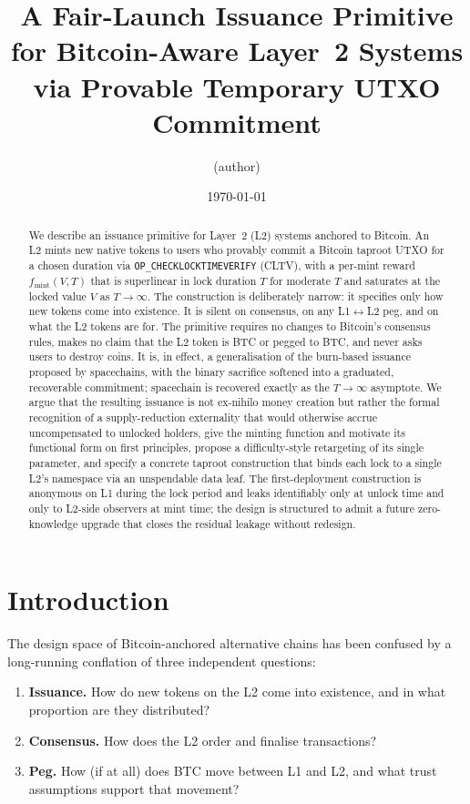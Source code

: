 \documentclass[11pt,a4paper]{article}
\title{\textbf{A Fair-Launch Issuance Primitive for Bitcoin-Aware Layer~2 Systems via Provable Temporary UTXO Commitment}}
\author{(author)}
\date{\today}
\newcommand{\fmint}{f_{\mathrm{mint}}}
\begin{document}
\maketitle

\begin{abstract}
\noindent We describe an issuance primitive for Layer~2 (L2) systems anchored to Bitcoin. An L2 mints new native tokens to users who provably commit a Bitcoin taproot UTXO for a chosen duration via \texttt{OP\_CHECKLOCKTIMEVERIFY} (CLTV), with a per-mint reward $\fmint(V, T)$ that is superlinear in lock duration $T$ for moderate $T$ and saturates at the locked value $V$ as $T \to \infty$. The construction is deliberately narrow: it specifies only how new tokens come into existence. It is silent on consensus, on any L1$\leftrightarrow$L2 peg, and on what the L2 tokens are for. The primitive requires no changes to Bitcoin's consensus rules, makes no claim that the L2 token is BTC or pegged to BTC, and never asks users to destroy coins. It is, in effect, a generalisation of the burn-based issuance proposed by spacechains, with the binary sacrifice softened into a graduated, recoverable commitment; spacechain is recovered exactly as the $T \to \infty$ asymptote. We argue that the resulting issuance is not ex-nihilo money creation but rather the formal recognition of a supply-reduction externality that would otherwise accrue uncompensated to unlocked holders, give the minting function and motivate its functional form on first principles, propose a difficulty-style retargeting of its single parameter, and specify a concrete taproot construction that binds each lock to a single L2's namespace via an unspendable data leaf. The first-deployment construction is anonymous on L1 during the lock period and leaks identifiably only at unlock time and only to L2-side observers at mint time; the design is structured to admit a future zero-knowledge upgrade that closes the residual leakage without redesign.
\end{abstract}

\section{Introduction}

The design space of Bitcoin-anchored alternative chains has been confused by a long-running conflation of three independent questions:

\begin{enumerate}[label=(\roman*),leftmargin=*]
  \item \textbf{Issuance.} How do new tokens on the L2 come into existence, and in what proportion are they distributed?
  \item \textbf{Consensus.} How does the L2 order and finalise transactions?
  \item \textbf{Peg.} How (if at all) does BTC move between L1 and L2, and what trust assumptions support that movement?
\end{enumerate}
\end{document}
